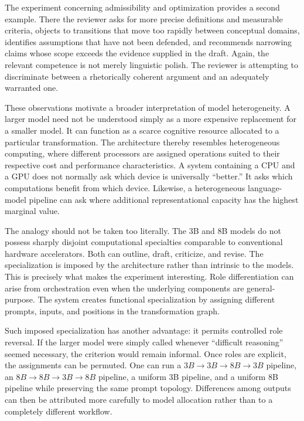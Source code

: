 \documentclass[11pt]{article}
\begin{document}
The experiment concerning admissibility and optimization provides a second example. There the reviewer asks for more precise definitions and measurable criteria, objects to transitions that move too rapidly between conceptual domains, identifies assumptions that have not been defended, and recommends narrowing claims whose scope exceeds the evidence supplied in the draft. Again, the relevant competence is not merely linguistic polish. The reviewer is attempting to discriminate between a rhetorically coherent argument and an adequately warranted one.

These observations motivate a broader interpretation of model heterogeneity. A larger model need not be understood simply as a more expensive replacement for a smaller model. It can function as a scarce cognitive resource allocated to a particular transformation. The architecture thereby resembles heterogeneous computing, where different processors are assigned operations suited to their respective cost and performance characteristics. A system containing a CPU and a GPU does not normally ask which device is universally ``better.'' It asks which computations benefit from which device. Likewise, a heterogeneous language-model pipeline can ask where additional representational capacity has the highest marginal value.

The analogy should not be taken too literally. The 3B and 8B models do not possess sharply disjoint computational specialties comparable to conventional hardware accelerators. Both can outline, draft, criticize, and revise. The specialization is imposed by the architecture rather than intrinsic to the models. This is precisely what makes the experiment interesting. Role differentiation can arise from orchestration even when the underlying components are general-purpose. The system creates functional specialization by assigning different prompts, inputs, and positions in the transformation graph.

Such imposed specialization has another advantage: it permits controlled role reversal. If the larger model were simply called whenever ``difficult reasoning'' seemed necessary, the criterion would remain informal. Once roles are explicit, the assignments can be permuted. One can run a \(3B\rightarrow3B\rightarrow8B\rightarrow3B\) pipeline, an \(8B\rightarrow8B\rightarrow3B\rightarrow8B\) pipeline, a uniform 3B pipeline, and a uniform 8B pipeline while preserving the same prompt topology. Differences among outputs can then be attributed more carefully to model allocation rather than to a completely different workflow.
\end{document}
